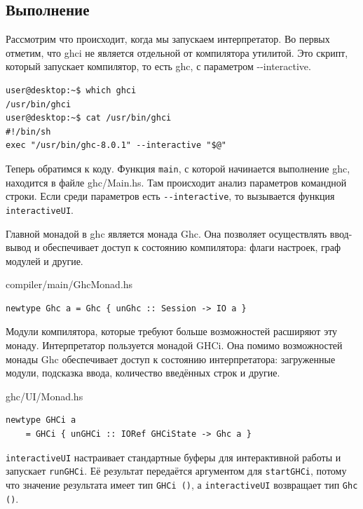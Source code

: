 \documentclass[fontsize=14pt, paper=a4, pagesize, DIV=calc]{scrartcl}
\def\code#1{\texttt{#1}}
\begin{document}
\subsection{Выполнение}

Рассмотрим что происходит, когда мы запускаем интерпретатор. Во первых отметим,
что ghci не является отдельной от компилятора утилитой. Это скрипт, который
запускает компилятор, то есть ghc, с параметром -{}-interactive.

\begin{ListingEnv}
\caption{}
\begin{lstlisting}[numbers=none]
user@desktop:~$ which ghci
/usr/bin/ghci
user@desktop:~$ cat /usr/bin/ghci
#!/bin/sh
exec "/usr/bin/ghc-8.0.1" --interactive "$@"
\end{lstlisting}
\end{ListingEnv}

Теперь обратимся к коду. Функция \code{main}, с которой начинается выполнение
ghc, находится в файле ghc/Main.hs. Там происходит анализ параметров командной
строки. Если среди параметров есть \code{-{}-interactive}, то вызывается
функция \code{interactiveUI}. 

Главной монадой в ghc является монада Ghc. Она позволяет осуществлять
ввод-вывод и обеспечивает доступ к состоянию компилятора: флаги настроек, граф
модулей и другие. 

\begin{ListingEnv}
\caption{compiler/main/GhcMonad.hs}
\begin{lstlisting}[numbers=none]
newtype Ghc a = Ghc { unGhc :: Session -> IO a }
\end{lstlisting}
\end{ListingEnv}

Модули компилятора, которые требуют больше возможностей расширяют эту монаду.
Интерпретатор пользуется монадой GHCi. Она помимо возможностей монады Ghc
обеспечивает доступ к состоянию интерпретатора: загруженные модули, подсказка
ввода, количество введённых строк и другие.

\begin{ListingEnv}
\caption{ghc/UI/Monad.hs}
\begin{lstlisting}[numbers=none]
newtype GHCi a 
    = GHCi { unGHCi :: IORef GHCiState -> Ghc a }
\end{lstlisting}
\end{ListingEnv}

\code{interactiveUI} настраивает стандартные буферы для интерактивной работы и
запускает \code{runGHCi}. Её результат передаётся аргументом для
\code{startGHCi}, потому что значение результата имеет тип \code{GHCi ()}, а
\code{interactiveUI} возвращает тип \code{Ghc ()}.
\end{document}
